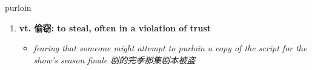
\begin{frame}
{\huge purloin}
\begin{center}
\begin{enumerate}\Large
  \item \textbf{vt. 偷窃: to steal, often in a violation of trust}
  \begin{itemize}
    \item \em{\Large{fearing that someone might attempt to purloin a copy of the script for the show's season finale 剧的完季那集剧本被盗}}
  \end{itemize}
\end{enumerate}
\end{center}
\end{frame}
